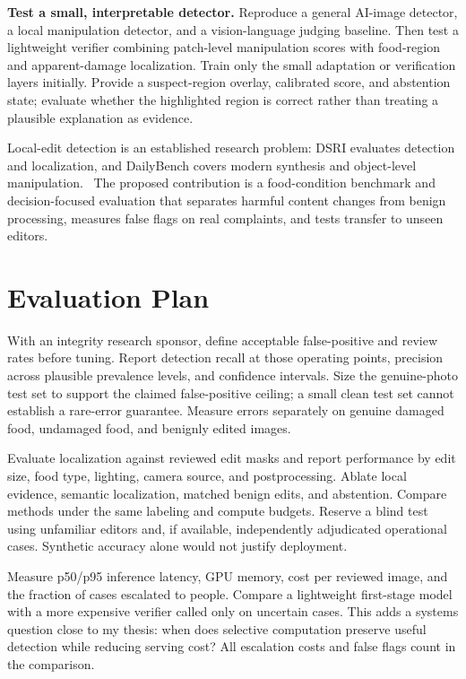 \documentclass{article}
\begin{document}
\textbf{Test a small, interpretable detector.} Reproduce a general AI-image detector, a local manipulation detector, and a vision-language judging baseline. Then test a lightweight verifier combining patch-level manipulation scores with food-region and apparent-damage localization. Train only the small adaptation or verification layers initially. Provide a suspect-region overlay, calibrated score, and abstention state; evaluate whether the highlighted region is correct rather than treating a plausible explanation as evidence.

Local-edit detection is an established research problem: DSRI evaluates detection and localization, and DailyBench covers modern synthesis and object-level manipulation.~\citep{dsriEditDetection2026,jiang2026dailybench} The proposed contribution is a food-condition benchmark and decision-focused evaluation that separates harmful content changes from benign processing, measures false flags on real complaints, and tests transfer to unseen editors.

\section{Evaluation Plan}
With an integrity research sponsor, define acceptable false-positive and review rates before tuning. Report detection recall at those operating points, precision across plausible prevalence levels, and confidence intervals. Size the genuine-photo test set to support the claimed false-positive ceiling; a small clean test set cannot establish a rare-error guarantee. Measure errors separately on genuine damaged food, undamaged food, and benignly edited images.

Evaluate localization against reviewed edit masks and report performance by edit size, food type, lighting, camera source, and postprocessing. Ablate local evidence, semantic localization, matched benign edits, and abstention. Compare methods under the same labeling and compute budgets. Reserve a blind test using unfamiliar editors and, if available, independently adjudicated operational cases. Synthetic accuracy alone would not justify deployment.

Measure p50/p95 inference latency, GPU memory, cost per reviewed image, and the fraction of cases escalated to people. Compare a lightweight first-stage model with a more expensive verifier called only on uncertain cases. This adds a systems question close to my thesis: when does selective computation preserve useful detection while reducing serving cost? All escalation costs and false flags count in the comparison.
\end{document}
